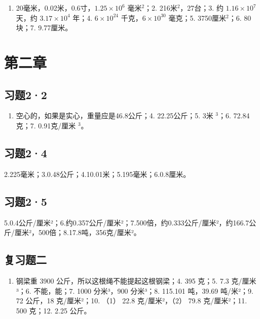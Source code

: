 \begin{enumerate}
\def\labelenumi{\arabic{enumi}.}
\tightlist
\item
  20毫米，0.02米，0.6寸，\(1.25 \times 10^{6}\) 毫米\(^{2}\)；2.
  216米\(^{2}\)，27台；3. 约 \(1.16 \times 10^{7}\) 天，约
  \(3.17 \times 10^{4}\) 年；4. \(6 \times 10^{24}\)
  千克，\(6 \times 10^{30}\) 毫克；5. 3750厘米\(^{2}\)；6. 80块；7.
  9.77厘米。
\end{enumerate}

\section{第二章}\label{ux7b2cux4e8cux7ae0}

\subsection{习题2·2}\label{ux4e60ux989822-1}

\begin{enumerate}
\def\labelenumi{\arabic{enumi}.}
\setcounter{enumi}{2}
\tightlist
\item
  空心的，如果是实心，重量应是46.8公斤；4. 22.25公斤；5. 3米
  \(^{3}\)；6. 72.84克；7. 0.91克/厘米 \(^{3}\)。
\end{enumerate}

\subsection{习题2·4}\label{ux4e60ux989824-1}

2.225毫米；3.0.48公斤；4.10.01米；5.195毫米；6.0.8厘米。

\subsection{习题2·5}\label{ux4e60ux989825-1}

5.0.4公斤/厘米²；6.约0.357公斤/厘米²；7.500倍，约0.333公斤/厘米²，约166.7公斤/厘米²，500倍；8.17.8吨，356克/厘米²。

\subsection{复习题二}\label{ux590dux4e60ux9898ux4e8c-1}

\begin{enumerate}
\def\labelenumi{\arabic{enumi}.}
\setcounter{enumi}{2}
\tightlist
\item
  钢梁重 3900 公斤，所以这根绳不能提起这根钢梁；4. 395 克；5. 7.3
  克/厘米³；6. 不能，能；7. 1000 分米³，900 分米³；8. 115.101 吨，39.69
  吨/米²；9. 72 公斤，18 克/厘米²；10. （1） 22.8 克/厘米²，（2） 79.8
  克/厘米²；11. 500 克；12. 2.25 公斤。
\end{enumerate}

